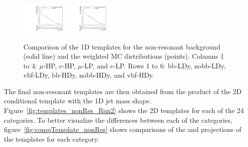 \begin{figure}[htbp]
  \includegraphics[width=0.2\textwidth]{fig/analysis/templateVsReco_nonRes_r0_MJ_mu_LP_vbf_HDy.pdf}
  \includegraphics[width=0.2\textwidth]{fig/analysis/templateVsReco_nonRes_r0_MJ_e_LP_vbf_HDy.pdf}\\
  \caption{
    Comparison of the 1D \MJ templates for the non-resonant background (solid line) and the weighted MC distributions (points).
    Columns 1 to 4: $\mu$-HP, $e$-HP, $\mu$-LP, and $e$-LP.
    Rows 1 to 6: bb-LDy, nobb-LDy, vbf-LDy, bb-HDy, nobb-HDy, and vbf-HDy.
  }
  \label{fig:1dtemplateVsReco_nonRes_MJ_Run2}
\end{figure}

The final non-resonant templates are then obtained from the product of the 2D conditional template with the 1D jet mass shape.
Figure~\ref{fig:templates_nonRes_Run2} shows the 2D templates for each of the 24 categories.
To better visualize the differences between each of the categories, figure~\ref{fig:compTemplate_nonRes} shows comparisons of the \MVV and \MJ projections of the templates for each category.

